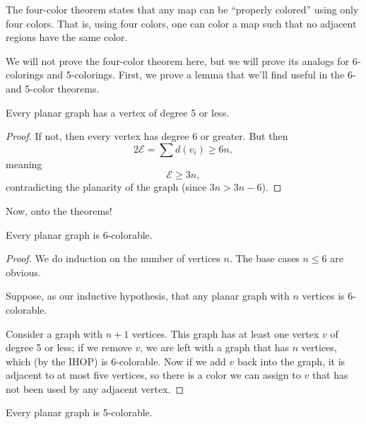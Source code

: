 \documentclass[../m055main.tex]{subfiles}
\begin{document}
The four-color theorem states that any map can be ``properly colored'' using only four colors.
That is, using four colors, one can color a map such that no adjacent regions have the same color.

We will not prove the four-color theorem here, but we will prove its analogs for 6-colorings and 5-colorings.
First, we prove a lemma that we'll find useful in the 6- and 5-color theorems.

\begin{lemma}[]
    Every planar graph has a vertex of degree 5 or less.
\end{lemma}

\begin{proof}
    If not, then every vertex has degree 6 or greater.
    But then
    \[ 2\mathcal{E} = \sum d(v_i) \geq 6n, \]
    meaning
    \[ \mathcal{E} \geq 3n, \]
    contradicting the planarity of the graph (since $3n > 3n-6$).
\end{proof}

Now, onto the theorems!

\begin{theorem}
    Every planar graph is 6-colorable.
\end{theorem}

\begin{proof}
    We do induction on the number of vertices $n$.
    The base cases $n \leq 6$ are obvious.

    Suppose, as our inductive hypothesis, that any planar graph with $n$ vertices is 6-colorable.

    Consider a graph with $n+1$ vertices.
    This graph has at least one vertex $v$ of degree 5 or less; if we remove $v$, we are left with a graph that has $n$ vertices, which (by the IHOP) is 6-colorable.
    Now if we add $v$ back into the graph, it is adjacent to at most five vertices, so there is a color we can assign to $v$ that has not been used by any adjacent vertex.
\end{proof}

\begin{theorem}
    Every planar graph is 5-colorable.
\end{theorem}
\end{document}
